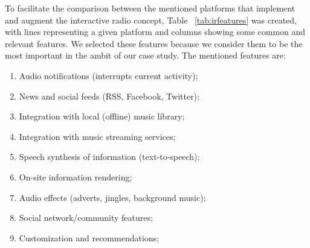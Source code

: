 To facilitate the comparison between the mentioned platforms that implement and augment the interactive radio concept, Table ~\ref{tab:irfeatures} was created, with lines representing a given platform and columns showing some common and relevant features. We selected these features because we consider them to be the most important in the ambit of our case study. The mentioned features are:

\begin{enumerate}[label=(\alph*)]
	\item Audio notifications (interrupts current activity);
	\item News and social feeds (RSS, Facebook, Twitter);
	\item Integration with local (offline) music library;
	\item Integration with music streaming services;
	\item Speech synthesis of information (text-to-speech);
	\item On-site information rendering;
	\item Audio effects (adverts, jingles, background music);
	\item Social network/community features;
	\item Customization and recommendations;
\end{enumerate}


